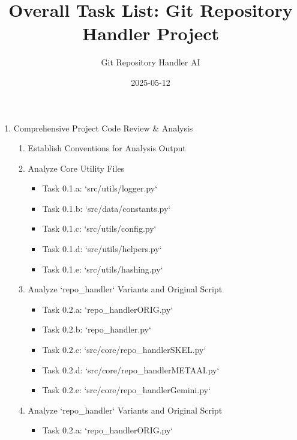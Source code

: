 \documentclass{article}
\title{Overall Task List: Git Repository Handler Project}
\author{Git Repository Handler AI}
\date{2025-05-12}
\newcommand{\taskdone}[1]{\colorbox{donecolor}{#1}}
\newcommand{\taskinprogress}[1]{\colorbox{inprogresscolor}{#1}}
\begin{document}
\maketitle
\begin{enumerate}[label=\textbf{Phase \arabic*:}, wide, labelwidth=!, labelindent=0pt]
    \item \taskinprogress{Comprehensive Project Code Review \& Analysis}
    \begin{enumerate}[label=\textbf{Task 0.\arabic*:}, wide, labelwidth=!, labelindent=0pt, leftmargin=*]
        \item \taskdone{Establish Conventions for Analysis Output}
        \item \taskdone{Analyze Core Utility Files}
        \begin{itemize}
            \item[\textbullet] \taskdone{Task 0.1.a: `src/utils/logger.py`}
            \item[\textbullet] \taskdone{Task 0.1.b: `src/data/constants.py`}
            \item[\textbullet] \taskdone{Task 0.1.c: `src/utils/config.py`}
            \item[\textbullet] \taskdone{Task 0.1.d: `src/utils/helpers.py`}
            \item[\textbullet] \taskdone{Task 0.1.e: `src/utils/hashing.py`}
        \end{itemize}
        \item \taskinprogress{Analyze `repo_handler` Variants and Original Script}
        \begin{itemize}
            \item[\textbullet] \taskdone{Task 0.2.a: `repo_handlerORIG.py`}
            \item[\textbullet] \taskdone{Task 0.2.b: `repo_handler.py`}
            \item[\textbullet] \taskinprogress{Task 0.2.c: `src/core/repo_handlerSKEL.py`}            \item[\textbullet] Task 0.2.d: `src/core/repo_handlerMETAAI.py`
            \item[\textbullet] Task 0.2.e: `src/core/repo_handlerGemini.py`
        \end{itemize}
        \item Analyze `repo_handler` Variants and Original Script
        \begin{itemize}
            \item[\textbullet] Task 0.2.a: `repo_handlerORIG.py`

\end{itemize}
\end{enumerate}
\end{enumerate}
\end{document}
